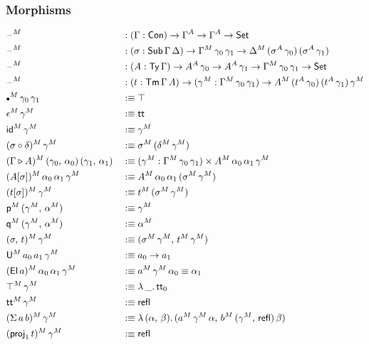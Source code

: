 \documentclass[12pt,a4paper,twoside,openany]{book}
\theoremstyle{remark}
\theoremstyle{definition}
\theoremstyle{theorem}
\newcommand{\refl}{\mathsf{refl}}
\newcommand{\id}{\mathsf{id}}
\newcommand{\Con}{\mathsf{Con}}
\newcommand{\Sub}{\mathsf{Sub}}
\newcommand{\Tm}{\mathsf{Tm}}
\newcommand{\Ty}{\mathsf{Ty}}
\newcommand{\U}{\mathsf{U}}
\newcommand{\El}{\mathsf{El}}
\newcommand{\proj}{\mathsf{proj}}
\renewcommand{\tt}{\mathsf{tt}}
\newcommand{\blank}{\mathord{\hspace{1pt}\text{--}\hspace{1pt}}}
\newcommand{\Set}{\mathsf{Set}}
\newcommand{\ext}{\triangleright}
\newcommand{\emptycon}{\scaleobj{.75}\bullet}
\newcommand{\p}{\mathsf{p}}
\newcommand{\q}{\mathsf{q}}
\newcommand{\defn}{:\equiv}
\begin{document}
\subsubsection{Morphisms}
\vspace{-0.5em}
\begin{alignat*}{3}
  &\blank^M &&: (\Gamma : \Con) \to \Gamma^A \to \Gamma^A \to \Set\\
  &\blank^M &&: (\sigma : \Sub\,\Gamma\,\Delta) \to \Gamma^M\,\gamma_0\,\gamma_1 \to \Delta^M\,(\sigma^A\,\gamma_0)\,(\sigma^A\,\gamma_1)\\
  &\blank^M &&: (A : \Ty\,\Gamma) \to A^A\,\gamma_0 \to A^A\,\gamma_1 \to \Gamma^M\,\gamma_0\,\gamma_1 \to \Set\\
  &\blank^M &&: (t : \Tm\,\Gamma\,A) \to (\gamma^M : \Gamma^M\,\gamma_0\,\gamma_1) \to A^M\,(t^A\,\gamma_0)\,(t^A\,\gamma_1)\,\gamma^M\\
  &\emptycon^M\,\gamma_0\,\gamma_1 &&\defn \top \\
  &\epsilon^M\,\gamma^M &&\defn \tt\\
  &\id^M\,\gamma^M &&\defn \gamma^M\\
  &(\sigma \circ \delta)^M\,\gamma^M &&\defn \sigma^M\,(\delta^M\,\gamma^M)\\
  &(\Gamma \ext A)^M\,(\gamma_0,\,\alpha_0)\,(\gamma_1,\,\alpha_1) &&\defn
    (\gamma^M : \Gamma^M\,\gamma_0\,\gamma_1) \times A^M\,\alpha_0\,\alpha_1\,\gamma^M\\
  &(A[\sigma])^M\,\alpha_0\,\alpha_1\,\gamma^M &&\defn A^M\,\alpha_0\,\alpha_1\,(\sigma^M\,\gamma^M)\\
  &(t[\sigma])^M\,\gamma^M &&\defn t^M\,(\sigma^M\,\gamma^M)\\
  &\p^M\,(\gamma^M,\,\alpha^M) &&\defn \gamma^M\\
  &\q^M\,(\gamma^M,\,\alpha^M) &&\defn \alpha^M\\
  &(\sigma,\,t)^M\,\gamma^M &&\defn (\sigma^M\,\gamma^M,\,t^M\,\gamma^M)\\
  &\U^M\,a_0\,a_1\,\gamma^M &&\defn a_0 \to a_1\\
  &(\El\,a)^M\,\alpha_0\,\alpha_1\,\gamma^M &&\defn a^M\,\gamma^M\,\alpha_0 \equiv \alpha_1 \\
  &\top^M\,\gamma^M &&\defn \lambda\,\_.\,\tt_0\\
  &\tt^M\,\gamma^M &&\defn \refl\\
  &(\Sigma\,a\,b)^M\,\gamma^M &&\defn \lambda\,(\alpha,\,\beta).\,(a^M\,\gamma^M\,\alpha,\,b^M\,(\gamma^M,\,\refl)\,\beta)\\
  &(\proj_1\,t)^M\,\gamma^M &&\defn \refl\\

\end{alignat*}
\end{document}
